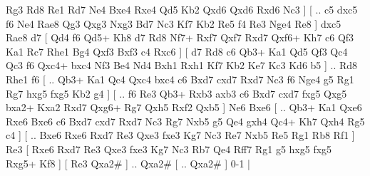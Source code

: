 Rg3 Rd8  Re1 Rd7  Ne4 Bxe4  Rxe4 Qd5  Kb2 Qxd6  Qxd6 Rxd6  Nc3   ]  [ .. c5  dxc5 f6  Ne4 Rae8  Qg3 Qxg3  Nxg3 Bd7  Nc3 Kf7  Kb2 Re5  f4 Re3  Nge4 Re8   ]  dxc5   Rae8    d7 [  Qd4 f6  Qd5+ Kh8  d7 Rd8  Nf7+ Rxf7  Qxf7 Rxd7  Qxf6+ Kh7  c6 Qf3  Ka1 Rc7  Rhe1 Bg4  Qxf3 Bxf3  c4 Rxc6   ]  [  d7 Rd8  c6 Qb3+  Ka1 Qd5  Qf3 Qc4  Qc3 f6  Qxc4+ bxc4  Nf3 Be4  Nd4 Bxh1  Rxh1 Kf7  Kb2 Ke7  Kc3 Kd6  b5   ] .. Rd8    Rhe1   f6 [ .. Qb3+  Ka1 Qc4  Qxc4 bxc4  c6 Bxd7  cxd7 Rxd7  Nc3 f6  Nge4 g5  Rg1 Rg7  hxg5 fxg5  Kb2 g4   ]  [ .. f6  Re3 Qb3+  Rxb3 axb3  c6 Bxd7  cxd7 fxg5  Qxg5 bxa2+  Kxa2 Rxd7  Qxg6+ Rg7  Qxh5 Rxf2  Qxb5   ]  Ne6   Bxe6 [ .. Qb3+  Ka1 Qxe6  Rxe6 Bxe6  c6 Bxd7  cxd7 Rxd7  Nc3 Rg7  Nxb5 g5  Qe4 gxh4  Qc4+ Kh7  Qxh4 Rg5  c4   ]  [ .. Bxe6  Rxe6 Rxd7  Re3 Qxe3  fxe3 Kg7  Nc3 Re7  Nxb5 Re5  Rg1 Rb8  Rf1   ]  Re3 [  Rxe6 Rxd7  Re3 Qxe3  fxe3 Kg7  Nc3 Rb7  Qe4 Rff7  Rg1 g5  hxg5 fxg5  Rxg5+ Kf8   ]  [  Re3 Qxa2#   ] .. Qxa2#    [ .. Qxa2#   ] 0-1  |

